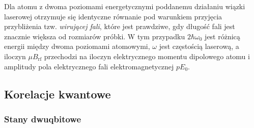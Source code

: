 \documentclass{myclass}
\begin{document}
Dla atomu z dwoma poziomami energetycznymi poddanemu działaniu wiązki laserowej otrzymuje się
identyczne równanie pod warunkiem przyjęcia przybliżenia tzw. \textit{wirującej fali}, które jest
prawdziwe, gdy długość fali jest znacznie większa od rozmiarów próbki. W tym przypadku
\(2\hbar\omega_0\) jest różnicą energii między dwoma poziomami atomowymi, \(\omega\) jest częstością
laserową, a iloczyn \(\mu B_\text{rf}\) przechodzi na iloczyn elektrycznego momentu dipolowego atomu
i amplitudy pola elektrycznego fali elektromagnetycznej \(p E_0\).

\subsection{Korelacje kwantowe}

\subsubsection{Stany dwuqbitowe}
\end{document}
